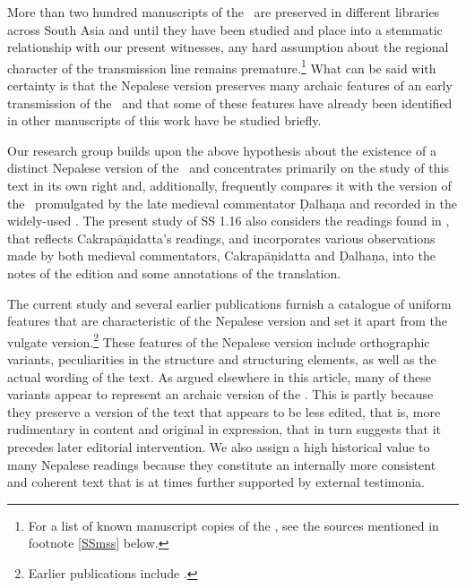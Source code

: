 More than two hundred manuscripts of the \SS\ are preserved in
different libraries across South Asia and until they have been studied and
place into a stemmatic relationship with our present witnesses, any hard
assumption about the regional character of the transmission line remains
premature.\footnote{For a list of known manuscript copies of the \SS, see
    the sources mentioned in footnote \ref{SSmss} below.} What can be said with
    certainty is that the Nepalese version preserves many archaic features of an
    early transmission of the \SS\ and that some of these features have already been
    identified in other manuscripts of this work have be studied briefly.%

Our research group builds upon the above hypothesis about the existence of a
distinct Nepalese version of the \SS\ and concentrates primarily on the study of
this text in its own right and, additionally, frequently compares it with the version
of the \SS\ promulgated by the late medieval commentator Ḍalhaṇa and recorded in
the widely-used \cite{vulgate}.  The present study of SS 1.16 also considers the
readings found in \cite{acar-1939}, that reflects Cakrapāṇidatta's readings, and
incorporates various observations made by both medieval commentators,
Cakrapāṇidatta and Ḍalhaṇa, into the notes of the edition and some annotations of
the translation. 

The current study and several earlier publications furnish a catalogue of
uniform features that are characteristic of the Nepalese version and set it
apart from the vulgate version.\footnote{ Earlier publications include
    \cite{hari-2011,wuja-2013,birc-2021,birc-2021a}.} These features of the
    Nepalese version include orthographic variants, peculiarities in the structure
    and structuring elements, as well as the actual wording of the text. As argued
    elsewhere in this article, many of these variants appear to represent an
    archaic version of the \SS.  This is partly because they preserve a version of
    the text that appears to be less edited, that is, more rudimentary in content
    and original in expression, that in turn suggests that it precedes later
    editorial intervention. We also assign a high historical value to many
    Nepalese readings  because they constitute an internally more consistent and
    coherent text that is at times further supported by external testimonia.

